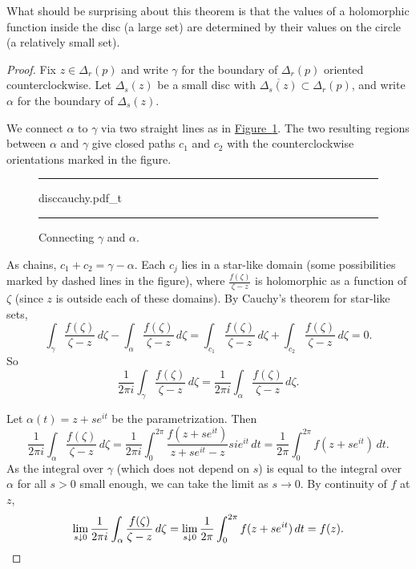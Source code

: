 \documentclass[12pt,openany]{book}
\theoremstyle{plain}
\theoremstyle{remark}
\theoremstyle{definition}
\newenvironment{myfig}{%
\begin{figure}[h!t]
\noindent\rule{\textwidth}{0.5pt}\vspace{12pt}\par\centering}%
{\par\noindent\rule{\textwidth}{0.5pt}
\end{figure}}
\theoremstyle{exercise}
\theoremstyle{example}
\newcommand{\figureref}[1]{\hyperref[#1]{Figure~\ref*{#1}}}
\begin{document}
What should be surprising about this theorem is that the values of a
holomorphic function inside the disc (a large set) are determined by their
values on the circle (a relatively small set).

\begin{proof}
Fix $z \in \Delta_r(p)$ and write
$\gamma$ for the boundary of $\Delta_r(p)$ oriented counterclockwise.
Let $\Delta_s(z)$ be a small disc with $\overline{\Delta_s(z)} \subset
\Delta_r(p)$, and write $\alpha$ for the boundary of $\Delta_s(z)$.

We connect $\alpha$ to $\gamma$
via two straight lines as in \figureref{fig:disccauchy}.
The two resulting regions between $\alpha$ and $\gamma$
give closed paths $c_1$ and $c_2$ with the counterclockwise
orientations marked in the figure.
\begin{myfig}
{disccauchy.pdf_t}
\caption{Connecting $\gamma$ and $\alpha$.%
\label{fig:disccauchy}}
\end{myfig}

As chains, $c_1+c_2 = \gamma - \alpha$.  Each
$c_j$ lies in a star-like domain (some possibilities marked by dashed lines in the figure),
where $\frac{f(\zeta)}{\zeta-z}$ is holomorphic
as a function of $\zeta$ (since $z$ is outside each of these domains).
By Cauchy's theorem for star-like sets,
\begin{equation*}
\int_{\gamma} \frac{f(\zeta)}{\zeta-z} \, d\zeta -
\int_{\alpha} \frac{f(\zeta)}{\zeta-z} \, d\zeta =
\int_{c_1} \frac{f(\zeta)}{\zeta-z} \, d\zeta + 
\int_{c_2} \frac{f(\zeta)}{\zeta-z} \, d\zeta = 0 .
\end{equation*}
So
\begin{equation*}
\frac{1}{2\pi i}
\int_{\gamma} \frac{f(\zeta)}{\zeta-z} \, d\zeta =
\frac{1}{2\pi i}
\int_{\alpha} \frac{f(\zeta)}{\zeta-z} \, d\zeta .
\end{equation*}

Let $\alpha(t) = z+s e^{i t}$ be the parametrization.
Then
\begin{equation*}
\frac{1}{2\pi i}
\int_{\alpha}
\frac{f(\zeta)}{\zeta-z}
\,
d \zeta
=
\frac{1}{2\pi i}
\int_0^{2\pi} \frac{f(z+se^{it})}{z + se^{it} - z} s i e^{it} \, dt
=
\frac{1}{2\pi}
\int_0^{2\pi} f(z+se^{it}) \, dt .
\end{equation*}
As the integral over $\gamma$ (which does not depend on $s$)
is equal to the integral over $\alpha$ for all $s > 0$ small enough,
we can take the limit as $s \to 0$.
By continuity of $f$ at $z$,
\begin{equation*}
\lim_{s \downarrow 0}
\frac{1}{2\pi i}
\int_{\alpha}
\frac{f(\zeta)}{\zeta-z}
\,
d \zeta
=
\lim_{s \downarrow 0}
\frac{1}{2\pi}
\int_0^{2\pi} f(z+se^{it}) \, dt
=
f(z) . \qedhere
\end{equation*}
\end{proof}
\end{document}
